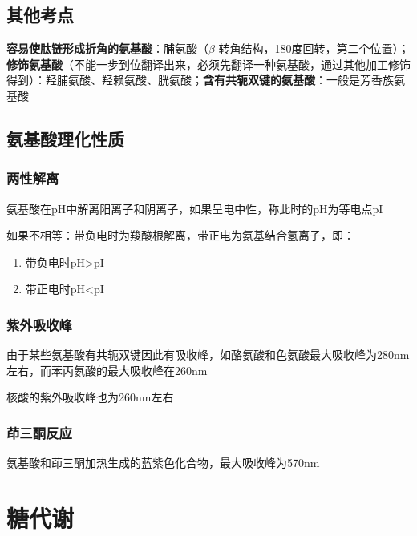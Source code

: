 \subsection{其他考点}%
\label{sub:其他考点}
\textbf{容易使肽链形成折角的氨基酸}：脯氨酸（$\beta$ 转角结构，180度回转，第二个位置）；\textbf{修饰氨基酸}（不能一步到位翻译出来，必须先翻译一种氨基酸，通过其他加工修饰得到）：羟脯氨酸、羟赖氨酸、胱氨酸；\textbf{含有共轭双键的氨基酸}：一般是芳香族氨基酸
\subsection{氨基酸理化性质}%
\label{sub:氨基酸理化性质}
\subsubsection*{两性解离}%
\label{subsub*:两性解离}
氨基酸在pH中解离阳离子和阴离子，如果呈电中性，称此时的pH为等电点pI

如果不相等：带负电时为羧酸根解离，带正电为氨基结合氢离子，即：
\begin{enumerate}
    \item 带负电时pH>pI
    \item 带正电时pH<pI
\end{enumerate}
\subsubsection*{紫外吸收峰}%
\label{subsub*:紫外吸收峰}
由于某些氨基酸有共轭双键因此有吸收峰，如酪氨酸和色氨酸最大吸收峰为280nm 左右，而苯丙氨酸的最大吸收峰在260nm
\begin{notation}
    核酸的紫外吸收峰也为260nm左右
\end{notation}
\subsubsection*{茚三酮反应}%
\label{subsub*:茚三酮反应}
氨基酸和茚三酮加热生成的蓝紫色化合物，最大吸收峰为570nm
\section*{糖代谢}%
\label{sec*:糖代谢}

